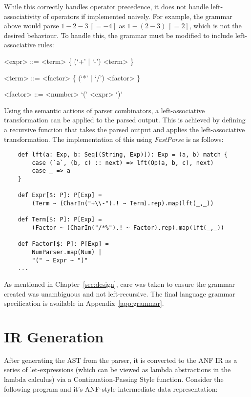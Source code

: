 While this correctly handles operator precedence, it does not handle left-associativity of
operators if implemented naively. For example, the grammar above would parse
\(1 - 2 - 3 ~[= -4]\) as \(1 - (2 - 3) ~[=2]\),
which is not the desired behaviour. To handle this, the grammar must be modified to include
left-associative rules:

\begin{grammar}
    <expr> ::= <term> \{ (`+' | `-') <term> \}

    <term> ::= <factor> \{ (`*' | `/') <factor> \}

    <factor> ::= <number>
    \alt `(' <expr> `)'
\end{grammar}

Using the semantic actions of parser combinators, a left-associative transformation can be
applied to the parsed output. This is achieved by defining a recursive function that takes the
parsed output and applies the left-associative transformation. The implementation of this using
\emph{FastParse} is as follows:

\begin{verbatim}
    def lft(a: Exp, b: Seq[(String, Exp)]): Exp = (a, b) match {
        case (`a`, (b, c) :: next) => lft(Op(a, b, c), next)
        case _ => a
    }

    def Expr[$: P]: P[Exp] =
        (Term ~ (CharIn("+\\-").! ~ Term).rep).map(lft(_,_))

    def Term[$: P]: P[Exp] =
        (Factor ~ (CharIn("/*%").! ~ Factor).rep).map(lft(_,_))

    def Factor[$: P]: P[Exp] =
        NumParser.map(Num) |
        "(" ~ Expr ~ ")"
    ...
\end{verbatim}

As mentioned in Chapter~\ref{sec:design}, care was taken to ensure the grammar created was
unambiguous and not left-recursive. The final language grammar specification is available in
Appendix~\ref{app:grammar}.

\section{IR Generation}

After generating the AST from the parser, it is converted to the ANF IR as a series of let-expressions
(which can be viewed as lambda abstractions in the lambda calculus) via a Continuation-Passing Style
function. Consider the following program and it's ANF-style intermediate data representation:

